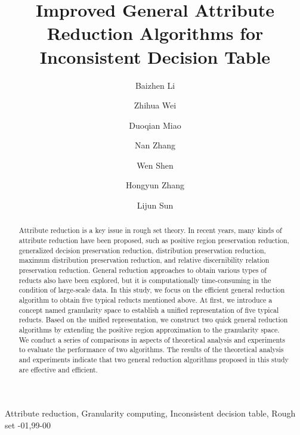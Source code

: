 \documentclass[review]{elsarticle}
\begin{document}
\begin{frontmatter}
\title{Improved General Attribute Reduction Algorithms for Inconsistent Decision Table}
\author[mymainaddress]{Baizhen Li}
\author[mymainaddress]{Zhihua Wei}
\author[mymainaddress]{Duoqian Miao}
\author[mysecondaryaddress]{Nan Zhang}
\author[mymainaddress]{Wen Shen}
\author[mymainaddress]{Hongyun Zhang}
\author[mymainaddress]{Lijun Sun}
\address[mymainaddress]{Tongji University, Shanghai 201804, PR China}
\address[mysecondaryaddress]{Yantai University, Yantai, Shandong 264005, PR China}

\begin{abstract}
Attribute reduction is a key issue in rough set theory. In recent years, many kinds of attribute reduction have been proposed, such as positive region preservation reduction, generalized decision preservation reduction, distribution preservation reduction, maximum distribution preservation reduction, and relative discernibility relation preservation reduction. General reduction approaches to obtain various types of reducts also have been explored, but it is computationally time-consuming in the condition of large-scale data. In this study, we focus on the efficient general reduction algorithm to obtain five typical reducts mentioned above. At first, we introduce a concept named granularity space to establish a unified representation of five typical reducts. Based on the unified representation, we construct two quick general reduction algorithms by extending the positive region approximation to the granularity space. We conduct a series of comparisons in aspects of theoretical analysis and experiments to evaluate the performance of two algorithms. The results of the theoretical analysis and experiments indicate that two general reduction algorithms proposed in this study are effective and efficient.
\end{abstract}

\begin{keyword}
Attribute reduction, Granularity computing, Inconsistent decision table, Rough set
-01\sep  99-00
\end{keyword}
\end{frontmatter}
\end{document}
